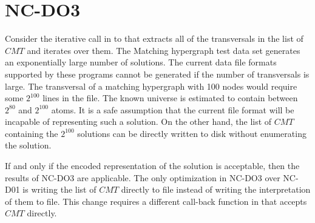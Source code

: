 \section{NC-DO3}
Consider the iterative call in  to  that extracts all of the transversals in the list of $CMT$ and iterates over them. The Matching hypergraph test data set generates an exponentially large number of solutions. The current data file formats supported by these programs cannot be generated if the number of transversals is large. The transversal of a matching hypergraph with 100 nodes would require some $2^{100}$ lines in the file. The known universe is estimated to contain between $2^{80}$ and $2^{100}$ atoms. It is a safe assumption that the current file format will be incapable of representing such a solution. On the other hand, the list of $CMT$ containing the $2^{100}$ solutions can be directly written to disk without enumerating the solution. 

If and only if the encoded representation of the solution is acceptable, then the results of NC-DO3 are applicable. The only optimization in NC-DO3 over NC-D01 is writing the list of $CMT$ directly to file instead of writing the interpretation of them to file. This change requires a different call-back function in  that accepts $CMT$ directly.


